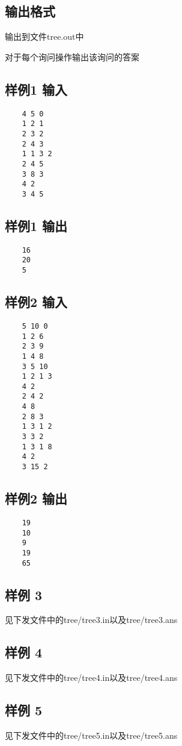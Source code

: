 \documentclass[12pt]{article}
\begin{document}
	\subsection{输出格式}
	输出到文件tree.out中\par
	对于每个询问操作输出该询问的答案
	\subsection{样例1 输入}
	\begin{lstlisting}
    4 5 0
    1 2 1
    2 3 2
    2 4 3
    1 1 3 2
    2 4 5
    3 8 3
    4 2
    3 4 5
	\end{lstlisting}
	\subsection{样例1 输出}
	\begin{lstlisting}
    16
    20
    5
	\end{lstlisting}
	\subsection{样例2 输入}
	\begin{lstlisting}
    5 10 0
    1 2 6
    2 3 9
    1 4 8
    3 5 10
    1 2 1 3
    4 2
    2 4 2
    4 8
    2 8 3
    1 3 1 2
    3 3 2
    1 3 1 8
    4 2
    3 15 2	
	\end{lstlisting}
	\subsection{样例2 输出}
	\begin{lstlisting}
    19
    10
    9
    19
    65
	\end{lstlisting}
	\subsection{样例 3}
	见下发文件中的tree/tree3.in以及tree/tree3.ans\par
	\subsection{样例 4}
	见下发文件中的tree/tree4.in以及tree/tree4.ans\par
	\subsection{样例 5}
	见下发文件中的tree/tree5.in以及tree/tree5.ans\par
\end{document}
